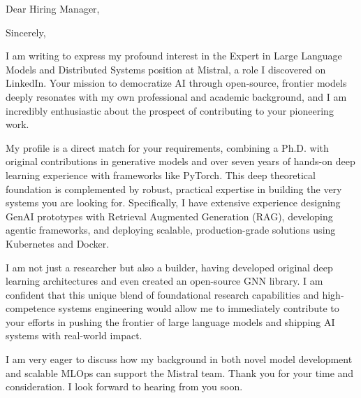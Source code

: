 \documentclass[12pt,letter,sans]{moderncv}        %
\begin{document}
\date{16 October 2025}
\opening{Dear Hiring Manager,}
\closing{Sincerely,}

\makelettertitle


I am writing to express my profound interest in the Expert in Large Language Models and Distributed Systems position at Mistral, a role I discovered on LinkedIn. Your mission to democratize AI through open-source, frontier models deeply resonates with my own professional and academic background, and I am incredibly enthusiastic about the prospect of contributing to your pioneering work.

My profile is a direct match for your requirements, combining a Ph.D. with original contributions in generative models and over seven years of hands-on deep learning experience with frameworks like PyTorch. This deep theoretical foundation is complemented by robust, practical expertise in building the very systems you are looking for. Specifically, I have extensive experience designing GenAI prototypes with Retrieval Augmented Generation (RAG), developing agentic frameworks, and deploying scalable, production-grade solutions using Kubernetes and Docker.

I am not just a researcher but also a builder, having developed original deep learning architectures and even created an open-source GNN library. I am confident that this unique blend of foundational research capabilities and high-competence systems engineering would allow me to immediately contribute to your efforts in pushing the frontier of large language models and shipping AI systems with real-world impact.

I am very eager to discuss how my background in both novel model development and scalable MLOps can support the Mistral team. Thank you for your time and consideration. I look forward to hearing from you soon.


\makeletterclosing


\newpage
\end{document}
